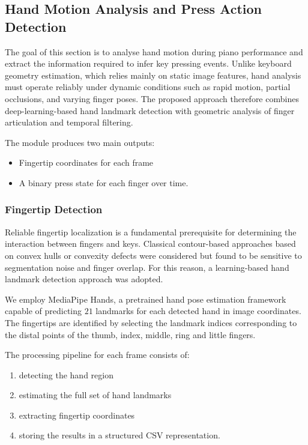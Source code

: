 \subsection{Hand Motion Analysis and Press Action Detection}
\label{sec:hand_analysis}

The goal of this section is to analyse hand motion during piano performance and extract the
information required to infer key pressing events. Unlike keyboard geometry estimation,
which relies mainly on static image features, hand analysis must operate reliably under
dynamic conditions such as rapid motion, partial occlusions, and varying finger poses.
The proposed approach therefore combines deep-learning-based hand landmark detection
with geometric analysis of finger articulation and temporal filtering.

The module produces two main outputs:

\begin{itemize}
\item Fingertip coordinates for each frame
\item A binary press state for each finger over time.
\end{itemize}

\subsubsection{Fingertip Detection}
\label{subsec:fingertip_detection}

Reliable fingertip localization is a fundamental prerequisite for determining the interaction
between fingers and keys. Classical contour-based approaches based on convex hulls or
convexity defects were considered but found to be sensitive to segmentation noise and
finger overlap. For this reason, a learning-based hand landmark detection approach was adopted.

We employ MediaPipe Hands, a pretrained hand pose estimation framework capable of
predicting $21$ landmarks for each detected hand in image coordinates. The fingertips are
identified by selecting the landmark indices corresponding to the distal points of the thumb,
index, middle, ring and little fingers.

The processing pipeline for each frame consists of:

\begin{enumerate}
\item detecting the hand region
\item estimating the full set of hand landmarks
\item extracting fingertip coordinates
\item storing the results in a structured CSV representation.
\end{enumerate}

